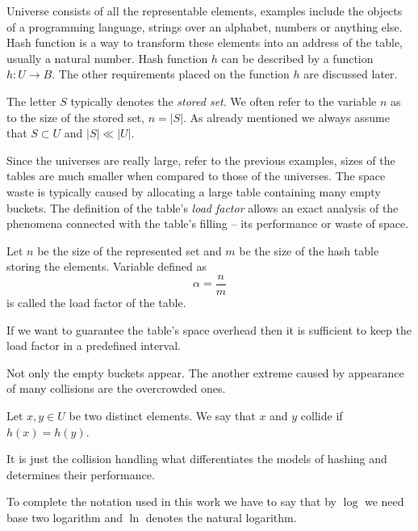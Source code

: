 Universe consists of all the representable elements, examples include the objects of a programming language, strings over an alphabet, numbers or anything else. Hash function is a way to transform these elements into an address of the table, usually a natural number. Hash function $h$ can be described by a function $h: U \rightarrow B$. The other requirements placed on the function $h$ are discussed later.

The letter $S$ typically denotes the \emph{stored set}. We often refer to the variable $n$ as to the size of the stored set, $n = |S|$. As already mentioned we always assume that $S \subset U$ and $|S| \ll |U|$.

Since the universes are really large, refer to the previous examples, sizes of the tables are much smaller when compared to those of the universes. The space waste is typically caused by allocating a large table containing many empty buckets. The definition of the table's \emph{load factor} allows an exact analysis of the phenomena connected with the table's filling -- its performance or waste of space.

\begin{definition}
\label{definition-load-factor}
Let $n$ be the size of the represented set and $m$ be the size of the hash table storing the elements. Variable defined as \[ \alpha = \frac{n}{m} \] is called the load factor of the table.
\end{definition}

If we want to guarantee the table's space overhead then it is sufficient to keep the load factor in a predefined interval.

Not only the empty buckets appear. The another extreme caused by appearance of many collisions are the overcrowded ones. 
\begin{definition}[Collision]
\label{definition-collision}
Let $x, y \in U$ be two distinct elements. We say that $x$ and $y$ collide if $h(x) = h(y)$.
\end{definition}

It is just the collision handling what differentiates the models of hashing and determines their performance.

To complete the notation used in this work we have to say that by $\log$ we need base two logarithm and $\ln$ denotes the natural logarithm.

